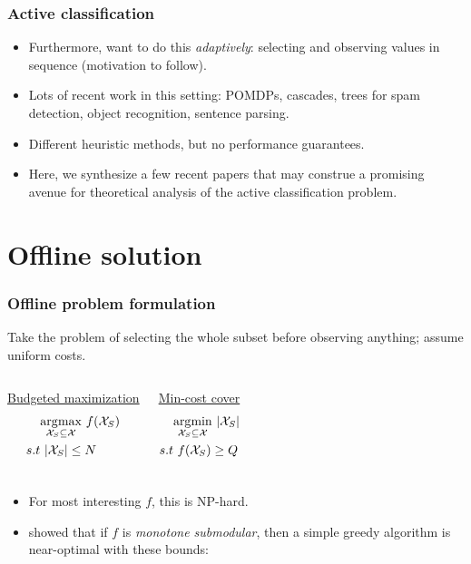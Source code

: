 \documentclass[handout]{beamer}
\begin{document}
\begin{frame}\frametitle{Active classification}
\begin{itemize}
    \item Furthermore, want to do this \emph{adaptively}: selecting and observing values in sequence (motivation to follow).
    \pause
    \item Lots of recent work in this setting: POMDPs, cascades, trees for spam detection, object recognition, sentence parsing.
    \pause
    \item Different heuristic methods, but no performance guarantees.
    \pause
    \item Here, we synthesize a few recent papers that may construe a promising avenue for theoretical analysis of the active classification problem.
\end{itemize}
\end{frame}


\section{Offline solution}

\begin{frame}\frametitle{Offline problem formulation}
Take the problem of selecting the whole subset before observing anything; assume uniform costs.
\vfill
\pause
\begin{columns}[c]
    \centering
    \underline{Budgeted maximization}
    \begin{align*}
    &\underset{\mathcal{X}_S \subseteq \mathcal{X}}{\argmax}\ f(\mathcal{X}_S)\\
    s.t &\ |\mathcal{X}_S| \leq N
    \end{align*}

    \centering
    \underline{Min-cost cover}
    \begin{align*}
    &\underset{\mathcal{X}_S \subseteq \mathcal{X}}{\argmin}\ |\mathcal{X}_S|\\
    s.t &\ f(\mathcal{X}_S) \geq Q
    \end{align*}
\end{columns}
\vfill
\begin{itemize}
    \pause
    \item For most interesting $f$, this is NP-hard.
    \pause
    \item \cite{Nemhauser-1978} showed that if $f$ is \emph{monotone submodular}, then a simple greedy algorithm is near-optimal with these bounds:
\end{itemize}


\end{frame}
\end{document}
